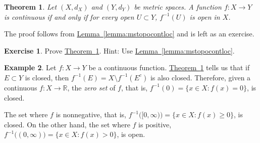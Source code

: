 \documentclass[12pt,openany]{book}
\newcommand{\R}{{\mathbb{R}}}
\newcommand{\myindex}[1]{#1\index{#1}}
\theoremstyle{plain}
\newtheorem{thm}{Theorem}[section]
\theoremstyle{remark}
\theoremstyle{definition}
\newenvironment{exbox}{%
    \def\FrameCommand{\vrule width 1pt \relax\hspace{10pt}}%
    \MakeFramed{\advance\hsize-\width\FrameRestore}%
}{%
    \endMakeFramed
}
\theoremstyle{exercise}
\newtheorem{exercise}{Exercise}[section]
\theoremstyle{example}
\newtheorem{example}[thm]{Example}
\newcommand{\thmref}[1]{\hyperref[#1]{Theorem~\ref*{#1}}}
\newcommand{\lemmaref}[1]{\hyperref[#1]{Lemma~\ref*{#1}}}
\begin{document}
\begin{thm} \label{thm:mstopocont}
Let $(X,d_X)$ and $(Y,d_Y)$ be metric spaces.  A function $f \colon X \to Y$
is continuous if and only if
for every open $U \subset Y$, $f^{-1}(U)$ is open in $X$.
\end{thm}

The proof follows from \lemmaref{lemma:mstopocontloc} and is left as
an exercise.

\begin{exbox}
\begin{exercise}
Prove \thmref{thm:mstopocont}.  Hint: Use \lemmaref{lemma:mstopocontloc}.
\end{exercise}
\end{exbox}


\begin{example}
Let $f \colon X \to Y$ be a continuous function.
\thmref{thm:mstopocont} tells us that if $E \subset Y$ is closed, then 
$f^{-1}(E) = X \setminus f^{-1}(E^c)$ is also closed.  Therefore,
given
a continuous $f \colon X \to \R$, the
\emph{\myindex{zero set}} of $f$, that is, 
$f^{-1}(0) = \{ x \in X :
f(x) = 0 \}$, is closed.

The set where $f$ is nonnegative, that is,
$f^{-1}\bigl( [0,\infty) \bigr) = \{ x \in X :
f(x) \geq 0 \}$, is closed.  On the other hand, the
set where $f$ is positive,
$f^{-1}\bigl( (0,\infty) \bigr) = \{ x \in X :
f(x) > 0 \}$, is open.  
\end{example}
\end{document}
